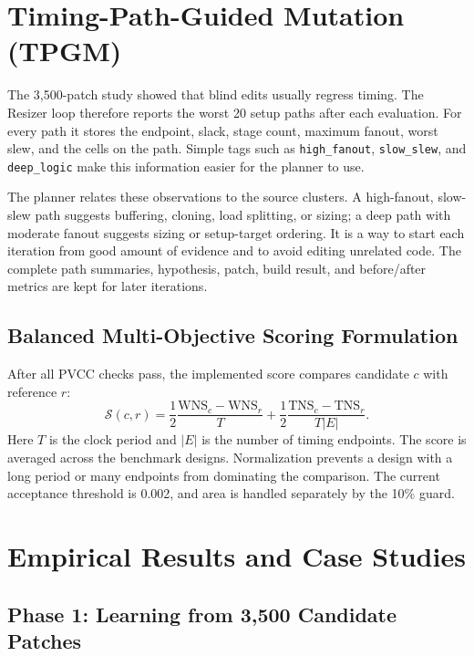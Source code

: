 \documentclass[10pt, conference]{IEEEtran}
\begin{document}
\section{Timing-Path-Guided Mutation (TPGM)}
\label{sec:tpgm}

The 3{,}500-patch study showed that blind edits usually regress timing. The Resizer loop therefore reports the worst 20 setup paths after each evaluation. For every path it stores the endpoint, slack, stage count, maximum fanout, worst slew, and the cells on the path. Simple tags such as \texttt{high\_fanout}, \texttt{slow\_slew}, and \texttt{deep\_logic} make this information easier for the planner to use.

The planner relates these observations to the source clusters. A high-fanout, slow-slew path suggests buffering, cloning, load splitting, or sizing; a deep path with moderate fanout suggests sizing or setup-target ordering.  It is a way to start each iteration from good amount of evidence and to avoid editing unrelated code. The complete path summaries, hypothesis, patch, build result, and before/after metrics are kept for later iterations.

\subsection{Balanced Multi-Objective Scoring Formulation}

After all PVCC checks pass, the implemented score compares candidate $c$ with reference $r$:
\begin{equation}
  \mathcal{S}(c,r)=\frac{1}{2}\frac{\mathrm{WNS}_c-\mathrm{WNS}_r}{T}
  +\frac{1}{2}\frac{\mathrm{TNS}_c-\mathrm{TNS}_r}{T|E|}.
\end{equation}
Here $T$ is the clock period and $|E|$ is the number of timing endpoints. The score is averaged across the benchmark designs. Normalization prevents a design with a long period or many endpoints from dominating the comparison. The current acceptance threshold is 0.002, and area is handled separately by the 10\% guard.

\section{Empirical Results and Case Studies}
\label{sec:results}

\subsection{Phase 1: Learning from 3{,}500 Candidate Patches}
\end{document}

